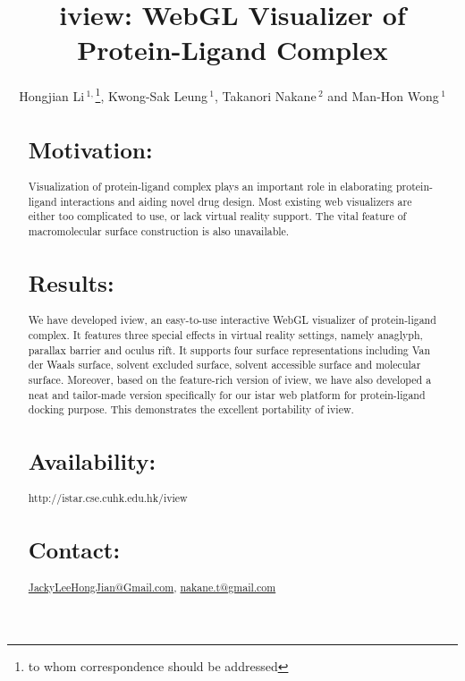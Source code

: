 \documentclass{bioinfo}
\begin{document}

\title[iview]{iview: WebGL Visualizer of Protein-Ligand Complex}
\author[Hongjian Li \textit{et~al}]{Hongjian Li\,$^{1,}$\footnote{to whom correspondence should be addressed}, Kwong-Sak Leung\,$^{1}$, Takanori Nakane\,$^{2}$ and Man-Hon Wong\,$^{1}$}
\address{$^{1}$Department of Computer Science and Engineering, Chinese University of Hong Kong, Hong Kong\\
$^{2}$Graduate School of Medicine, Kyoto University, Japan}



\maketitle

\begin{abstract}

\section{Motivation:}
Visualization of protein-ligand complex plays an important role in elaborating protein-ligand interactions and aiding novel drug design. Most existing web visualizers are either too complicated to use, or lack virtual reality support. The vital feature of macromolecular surface construction is also unavailable.

\section{Results:}
We have developed iview, an easy-to-use interactive WebGL visualizer of protein-ligand complex. It features three special effects in virtual reality settings, namely anaglyph, parallax barrier and oculus rift. It supports four surface representations including Van der Waals surface, solvent excluded surface, solvent accessible surface and molecular surface. Moreover, based on the feature-rich version of iview, we have also developed a neat and tailor-made version specifically for our istar web platform for protein-ligand docking purpose. This demonstrates the excellent portability of iview.

\section{Availability:}
http://istar.cse.cuhk.edu.hk/iview

\section{Contact:} \href{JackyLeeHongJian@Gmail.com}{JackyLeeHongJian@Gmail.com}, \href{nakane.t@gmail.com}{nakane.t@gmail.com}
\end{abstract}
\end{document}
